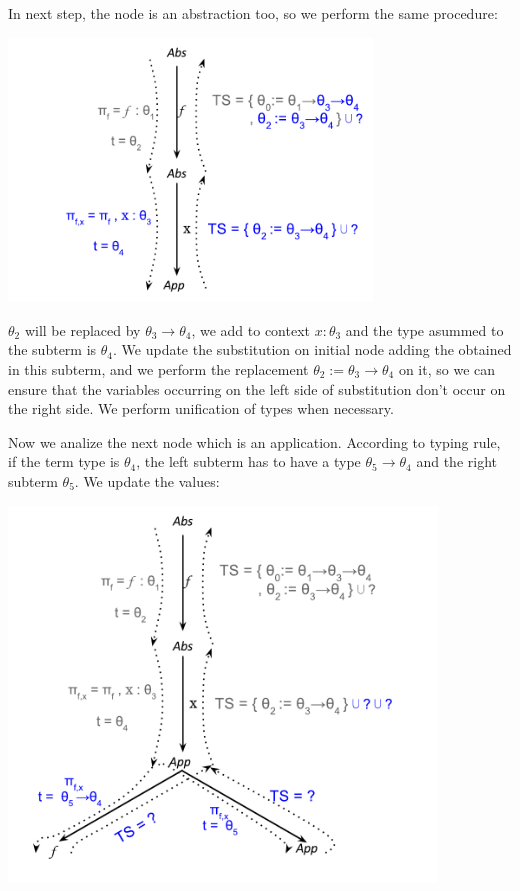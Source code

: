 \documentclass[a4paper,10pt]{article}
\begin{document}
  In next step, the node is an abstraction too, so we perform the same procedure:
   
  \begin{center}
	\includegraphics[height=7cm]{segundo.pdf}
  \end{center}

  \noindent $\theta_2$ will be replaced by $\theta_3 \rightarrow \theta_4$, we add to context $x:\theta_3$ and
  the type asummed to the subterm is $\theta_4$. We update the substitution on initial node adding the obtained
  in this subterm, and we perform the replacement $\theta_2 := \theta_3 \rightarrow \theta_4$ on it, so
  we can ensure that the variables occurring on the left side of substitution don't occur on the right side. We
  perform unification of types when necessary.
  \medskip
  
  Now we analize the next node which is an application. According to typing rule, if the term type is $\theta_4$,
  the left subterm has to have a type $\theta_5 \rightarrow \theta_4$ and the right subterm $\theta_5$.
  We update the values:
  
  \begin{center}
	\includegraphics[height=10cm]{tercero.pdf}
  \end{center}
  
\end{document}
